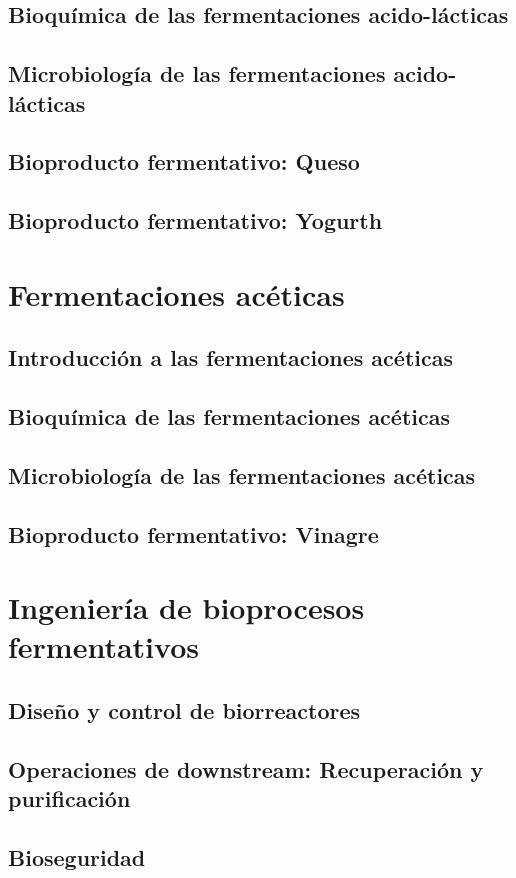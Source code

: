 \documentclass{ManualBiotecnologico}
\begin{document}
    \chapter{Bioquímica de las fermentaciones acido-lácticas}
    \chapter{Microbiología de las fermentaciones acido-lácticas}
    \chapter{Bioproducto fermentativo: Queso}
    \chapter{Bioproducto fermentativo: Yogurth}

\part{Fermentaciones acéticas}

    \chapter{Introducción a las fermentaciones acéticas}
    \chapter{Bioquímica de las fermentaciones acéticas}
    \chapter{Microbiología de las fermentaciones acéticas}
    \chapter{Bioproducto fermentativo: Vinagre}

\part{Ingeniería de bioprocesos fermentativos}

    \chapter{Diseño y control de biorreactores}
    \chapter{Operaciones de downstream: Recuperación y purificación}
    \chapter{Bioseguridad}




    \PlainGeom
    \appendix
    
    
    \backmatter

\Bibliografia
\Glosarios
    
\end{document}
